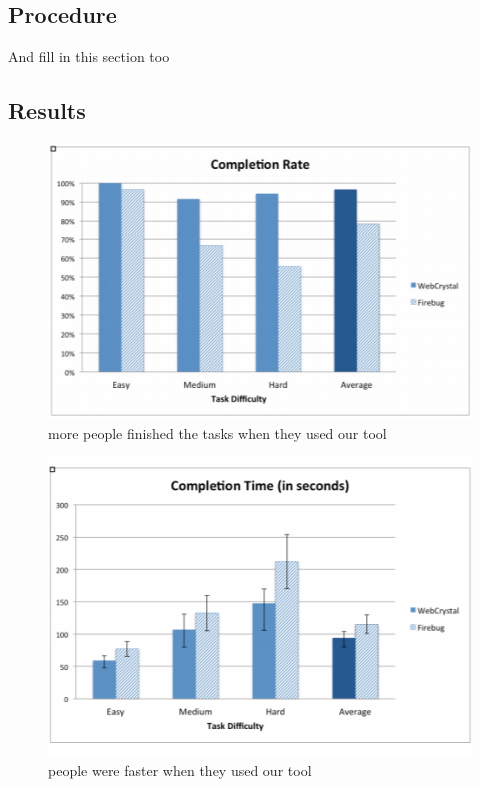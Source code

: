 \documentclass{sigchi}
\begin{document}
\subsection{Procedure}
And fill in this section too

\subsection{Results}
\begin{figure}
    \centering
    \includegraphics[width=\columnwidth]{figures/completion_rates.PNG}
    \caption{more people finished the tasks when they used our tool}  
    \label{fig:xray_screenshot}
\end{figure}

\begin{figure}
    \centering
    \includegraphics[width=\columnwidth]{figures/completion_time.PNG}
    \caption{people were faster when they used our tool}  
    \label{fig:xray_screenshot}
\end{figure}
\end{document}
